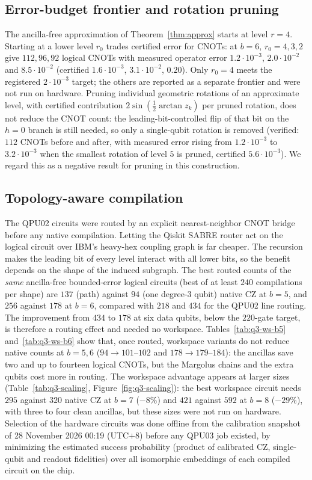 \documentclass[11pt]{article}
\begin{document}
\subsection{Error-budget frontier and rotation pruning}
The ancilla-free approximation of Theorem~\ref{thm:approx} starts at level $r=4$. Starting at a lower level $r_0$ trades certified error for CNOTs: at $b=6$, $r_0=4,3,2$ give $112,96,92$ logical CNOTs with measured operator error $1.2\cdot10^{-3}$, $2.0\cdot10^{-2}$ and $8.5\cdot10^{-2}$ (certified $1.6\cdot10^{-3}$, $3.1\cdot10^{-2}$, $0.20$). Only $r_0=4$ meets the registered $2\cdot10^{-3}$ target; the others are reported as a separate frontier and were not run on hardware. Pruning individual geometric rotations of an approximate level, with certified contribution $2\sin(\tfrac12\arctan z_k)$ per pruned rotation, does not reduce the CNOT count: the leading-bit-controlled flip of that bit on the $h=0$ branch is still needed, so only a single-qubit rotation is removed (verified: $112$ CNOTs before and after, with measured error rising from $1.2\cdot10^{-3}$ to $3.2\cdot10^{-3}$ when the smallest rotation of level $5$ is pruned, certified $5.6\cdot10^{-3}$). We regard this as a negative result for pruning in this construction.

\subsection{Topology-aware compilation}
The QPU02 circuits were routed by an explicit nearest-neighbor CNOT bridge before any native compilation. Letting the Qiskit SABRE router act on the logical circuit over IBM's heavy-hex coupling graph is far cheaper. The recursion makes the leading bit of every level interact with all lower bits, so the benefit depends on the shape of the induced subgraph. The best routed counts of the \emph{same} ancilla-free bounded-error logical circuits (best of at least $240$ compilations per shape) are $137$ (path) against $94$ (one degree-3 qubit) native CZ at $b=5$, and $256$ against $178$ at $b=6$, compared with $218$ and $434$ for the QPU02 line routing. The improvement from $434$ to $178$ at six data qubits, below the $220$-gate target, is therefore a routing effect and needed no workspace. Tables~\ref{tab:q3-ws-b5} and~\ref{tab:q3-ws-b6} show that, once routed, workspace variants do not reduce native counts at $b=5,6$ ($94\to101$--$102$ and $178\to179$--$184$): the ancillas save two and up to fourteen logical CNOTs, but the Margolus chains and the extra qubits cost more in routing. The workspace advantage appears at larger sizes (Table~\ref{tab:q3-scaling}, Figure~\ref{fig:q3-scaling}): the best workspace circuit needs $295$ against $320$ native CZ at $b=7$ ($-8\%$) and $421$ against $592$ at $b=8$ ($-29\%$), with three to four clean ancillas, but these sizes were not run on hardware. Selection of the hardware circuits was done offline from the calibration snapshot of 28 November 2026 00:19 (UTC$+8$) before any QPU03 job existed, by minimizing the estimated success probability (product of calibrated CZ, single-qubit and readout fidelities) over all isomorphic embeddings of each compiled circuit on the chip.
\end{document}
